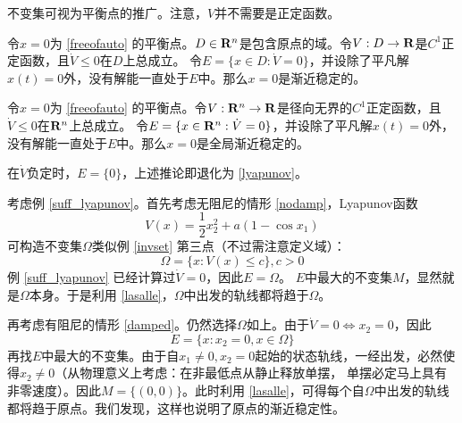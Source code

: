 \begin{note}
	不变集可视为平衡点的推广。注意，$V$并不需要是正定函数。
\end{note}
\begin{corollary}
	令$x=0$为 \eqref{freeofauto} 的平衡点。$D\in\mathbf{R}{}^n$是包含原点的域。令$V:D\to\mathbf{R}{}$是$C^1$正定函数，且$\dot{V}\le 0$在$D$上总成立。
	令$E=\{x\in D:\dot{V}=0\}$，并设除了平凡解$x(t)=0$外，没有解能一直处于$E$中。那么$x=0$是渐近稳定的。
\end{corollary}
\begin{corollary}\label{lasallegas}
	令$x=0$为 \eqref{freeofauto} 的平衡点。令$V:\mathbf{R}{}^n\to\mathbf{R}{}$是径向无界的$C^1$正定函数，且$\dot{V}\le 0$在$\mathbf{R}{}^n$上总成立。
	令$E=\{x\in \mathbf{R}{}^n:\dot{V}=0\}$，并设除了平凡解$x(t)=0$外，没有解能一直处于$E$中。那么$x=0$是全局渐近稳定的。
\end{corollary}
\begin{note}
	在$\dot{V}$负定时，$E=\{0\}$，上述推论即退化为 \ref{lyapunov}。
\end{note}
\begin{example}[利用LaSalle定理判别单摆系统稳定性]
	考虑例 \ref{suff_lyapunov}。首先考虑无阻尼的情形 \eqref{nodamp}，Lyapunov函数\[V(x)=\frac{1}{2}x_2^2+a(1-\cos x_1)\]
	可构造不变集$\Omega$类似例 \ref{invset} 第三点（不过需注意定义域）：\[\Omega=\{x:V(x)\le c\},c>0\]
	例 \ref{suff_lyapunov} 已经计算过$\dot{V}=0$，因此$E=\Omega$。
	$E$中最大的不变集$M$，显然就是$\Omega$本身。于是利用 \ref{lasalle}，$\Omega$中出发的轨线都将趋于$\Omega$。

	再考虑有阻尼的情形 \eqref{damped}。仍然选择$\Omega$如上。由于$\dot{V}=0\iff x_2=0$，因此\[E=\{x:x_2=0,x\in\Omega\}\]
	再找$E$中最大的不变集。由于自$x_1\ne 0,x_2=0$起始的状态轨线，一经出发，必然使得$x_2\ne 0$（从物理意义上考虑：在非最低点从静止释放单摆，
	单摆必定马上具有非零速度）。因此$M=\{(0,0)\}$。此时利用 \ref{lasalle}，可得每个自$\Omega$中出发的轨线都将趋于原点。我们发现，这样也说明了原点的渐近稳定性。
\end{example}
